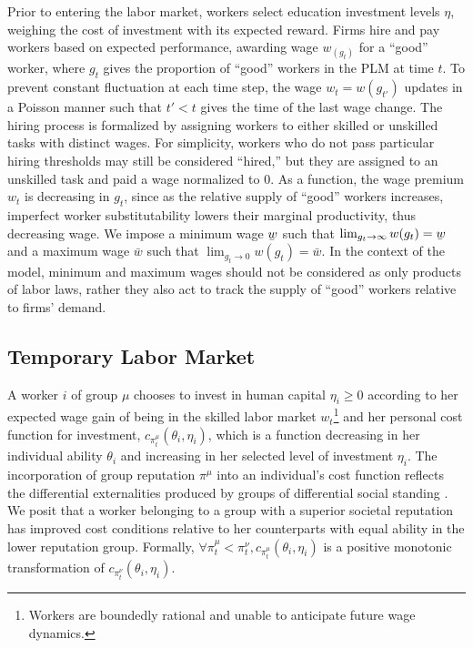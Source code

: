 \documentclass[sigconf]{acmart}
\theoremstyle{definition}
\begin{document}
Prior to entering the labor market, workers select education investment levels $\eta$, weighing the cost of investment with its expected reward. Firms hire and pay workers based on expected performance, awarding wage $w_(g_t)$ for a ``good'' worker, where $g_t$ gives the proportion of ``good'' workers in the PLM at time $t$. To prevent constant fluctuation at each time step, the wage $w_{t} = w(g_{t'})$ updates in a Poisson manner such that $t' < t$ gives the time of the last wage change. The hiring process is formalized by assigning workers to either skilled or unskilled tasks with distinct wages. For simplicity, workers who do not pass particular hiring thresholds may still be considered ``hired,'' but they are assigned to an unskilled task and paid a wage normalized to $0$. As a function, the wage premium $w_t$ is decreasing in $g_t$, since as the relative supply of ``good'' workers increases, imperfect worker substitutability lowers their marginal productivity, thus decreasing wage. We impose a minimum wage $\underaccent{\bar}{w}$ such that $\lim_{g_t \to \infty} w(g_t) = \underaccent{\bar}{w}$ and a maximum wage $\bar{w}$ such that $\lim_{g_t \to 0} w(g_t) = \bar{w}$. In the context of the model, minimum and maximum wages should not be considered as only products of labor laws, rather they also act to track the supply of ``good'' workers relative to firms' demand. 


\subsection{Temporary Labor Market}
A worker $i$ of group $\mu$ chooses to invest in human capital $\eta_i \ge 0$ according to her expected wage gain of being in the skilled labor market $w_t$\footnote{Workers are boundedly rational and unable to anticipate future wage dynamics.} and her personal cost function for investment, $c_{\pi^{\mu}_{t}}(\theta_i, \eta_i)$, which is a function decreasing in her individual ability $\theta_i$ and increasing in her selected level of investment $\eta_i$. The incorporation of group reputation $\pi^\mu$ into an individual's cost function reflects the differential externalities produced by groups of differential social standing \citep{bowles2014group}. We posit that a worker belonging to a group with a superior societal reputation has improved cost conditions relative to her counterparts with equal ability in the lower reputation group. Formally, $\forall \pi^\mu_{t} < \pi^\nu_{t}, c_{ \pi^\mu_{t}}(\theta_i, \eta_i)$ is a positive monotonic transformation of $c_{\pi^{\nu}_{t}}(\theta_i, \eta_i)$. 
\end{document}

